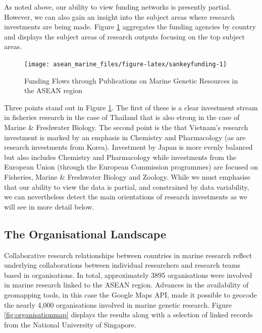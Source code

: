 \documentclass[openany]{book}
\theoremstyle{definition}
\theoremstyle{definition}
\theoremstyle{definition}
\theoremstyle{remark}
\begin{document}
As noted above, our ability to view funding networks is presently
partial. However, we can also gain an insight into the subject areas
where research investments are being made. Figure
\ref{fig:sankeyfunding} aggregates the funding agencies by country and
displays the subject areas of research outputs focusing on the top
subject areas.

\begin{figure}

{\centering \texttt{[image: asean\_marine\_files/figure-latex/sankeyfunding-1]} 

}

\caption{Funding Flows through Publications on Marine Genetic Resources in the ASEAN region}\label{fig:sankeyfunding}
\end{figure}

Three points stand out in Figure \ref{fig:sankeyfunding}. The first of
these is a clear investment stream in fisheries research in the case of
Thailand that is also strong in the case of Marine \& Freshwater
Biology. The second point is the that Vietnam's research investment is
marked by an emphasis in Chemistry and Pharmacology (as are research
investments from Korea). Investment by Japan is more evenly balanced but
also includes Chemistry and Pharmacology while investments from the
European Union (through the European Commission programmes) are focused
on Fisheries, Marine \& Freshwater Biology and Zoology. While we must
emphasise that our ability to view the data is partial, and constrained
by data variability, we can nevertheless detect the main orientations of
research investments as we will see in more detail below.

\hypertarget{the-organisational-landscape}{%
\subsection{The Organisational
Landscape}\label{the-organisational-landscape}}

Collaborative research relationships between countries in marine
research reflect underlying collaborations between individual
researchers and research teams based in organisations. In total,
approximately 3895 organisations were involved in marine research linked
to the ASEAN region. Advances in the availability of geomapping tools,
in this case the Google Maps API, made it possible to geocode the nearly
4,000 organisations involved in marine genetic research. Figure
\ref{fig:organisationmap} displays the results along with a selection of
linked records from the National University of Singapore.
\end{document}
